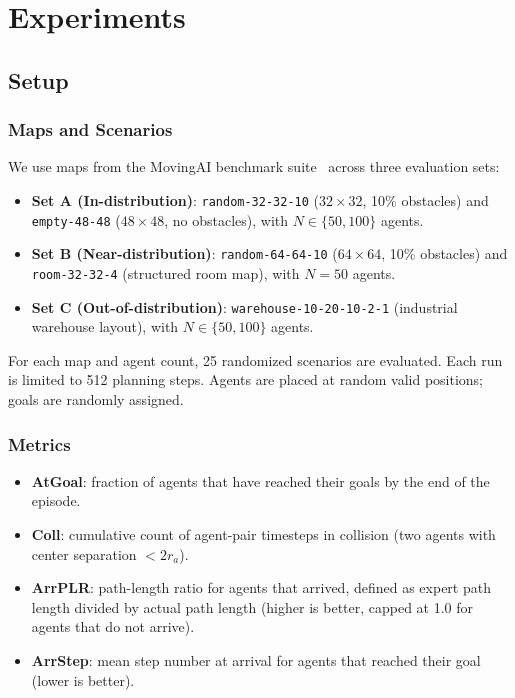 \section{Experiments}
\label{sec:experiments}

\subsection{Setup}

\subsubsection{Maps and Scenarios}

We use maps from the MovingAI benchmark suite~\cite{sturtevant2012movingai} across three evaluation sets:

\begin{itemize}
  \item \textbf{Set A (In-distribution)}: \texttt{random-32-32-10} ($32{\times}32$, 10\% obstacles) and \texttt{empty-48-48} ($48{\times}48$, no obstacles), with $N \in \{50, 100\}$ agents.
  \item \textbf{Set B (Near-distribution)}: \texttt{random-64-64-10} ($64{\times}64$, 10\% obstacles) and \texttt{room-32-32-4} (structured room map), with $N{=}50$ agents.
  \item \textbf{Set C (Out-of-distribution)}: \texttt{warehouse-10-20-10-2-1} (industrial warehouse layout), with $N \in \{50, 100\}$ agents.
\end{itemize}

For each map and agent count, 25 randomized scenarios are evaluated. Each run is limited to 512 planning steps. Agents are placed at random valid positions; goals are randomly assigned.

\subsubsection{Metrics}

\begin{itemize}
  \item \textbf{AtGoal}: fraction of agents that have reached their goals by the end of the episode.
  \item \textbf{Coll}: cumulative count of agent-pair timesteps in collision (two agents with center separation $< 2r_a$).
  \item \textbf{ArrPLR}: path-length ratio for agents that arrived, defined as expert path length divided by actual path length (higher is better, capped at 1.0 for agents that do not arrive).
  \item \textbf{ArrStep}: mean step number at arrival for agents that reached their goal (lower is better).
\end{itemize}

